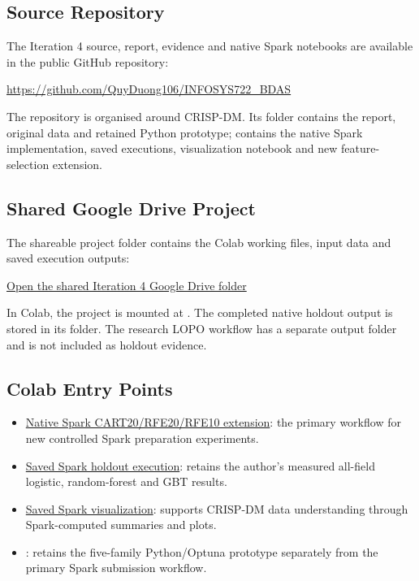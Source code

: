 \subsection{Source Repository}
The Iteration 4 source, report, evidence and native Spark notebooks are available in the public GitHub repository:
\begin{center}
\url{https://github.com/QuyDuong106/INFOSYS722_BDAS}
\end{center}
The repository is organised around CRISP-DM. Its  folder contains the report, original data and retained Python prototype;  contains the native Spark implementation, saved executions, visualization notebook and new feature-selection extension.

\subsection{Shared Google Drive Project}
The shareable project folder contains the Colab working files, input data and saved execution outputs:
\begin{center}
\href{https://drive.google.com/drive/folders/1ob80bZnuNHHwhGT3gY-HXrj1-4I0VZ_F?usp=sharing}{Open the shared Iteration 4 Google Drive folder}
\end{center}
In Colab, the project is mounted at . The completed native holdout output is stored in its  folder. The research LOPO workflow has a separate output folder and is not included as holdout evidence.

\subsection{Colab Entry Points}
\begin{itemize}
\item \href{https://colab.research.google.com/github/QuyDuong106/INFOSYS722_BDAS/blob/main/PySpark/run_spark_iterations_colab.ipynb}{Native Spark CART20/RFE20/RFE10 extension}: the primary workflow for new controlled Spark preparation experiments.
\item \href{https://colab.research.google.com/github/QuyDuong106/INFOSYS722_BDAS/blob/main/PySpark/run_spark_workflow.ipynb}{Saved Spark holdout execution}: retains the author's measured all-field logistic, random-forest and GBT results.
\item \href{https://colab.research.google.com/github/QuyDuong106/INFOSYS722_BDAS/blob/main/PySpark/spark_visualization_colab.ipynb}{Saved Spark visualization}: supports CRISP-DM data understanding through Spark-computed summaries and plots.
\item {}: retains the five-family Python/Optuna prototype separately from the primary Spark submission workflow.
\end{itemize}

